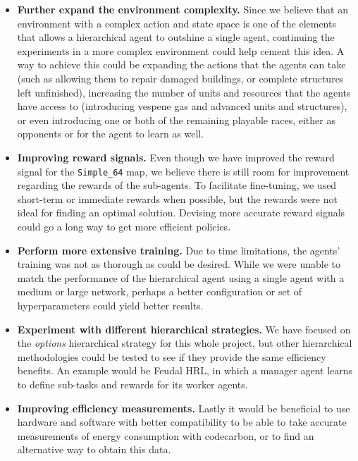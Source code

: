 \begin{itemize}
    \item \textbf{Further expand the environment complexity.} Since we believe that an environment with a complex action and state space is one of the elements that allows a hierarchical agent to outshine a single agent, continuing the experiments in a more complex environment could help cement this idea. A way to achieve this could be expanding the actions that the agents can take (such as allowing them to repair damaged buildings, or complete structures left unfinished), increasing the number of units and resources that the agents have access to (introducing vespene gas and advanced units and structures), or even introducing one or both of the remaining playable races, either as opponents or for the agent to learn as well.
    \item \textbf{Improving reward signals.} Even though we have improved the reward signal for the \texttt{Simple\_64} map, we believe there is still room for improvement regarding the rewards of the sub-agents. To facilitate fine-tuning, we used short-term or immediate rewards when possible, but the rewards were not ideal for finding an optimal solution. Devising more accurate reward signals could go a long way to get more efficient policies.
    \item \textbf{Perform more extensive training.} Due to time limitations, the agents' training was not as thorough as could be desired. While we were unable to match the performance of the hierarchical agent using a single agent with a medium or large network, perhaps a better configuration or set of hyperparameters could yield better results.
    \item \textbf{Experiment with different hierarchical strategies.} We have focused on the \textit{options} hierarchical strategy for this whole project, but other hierarchical methodologies could be tested to see if they provide the same efficiency benefits. An example would be Feudal HRL, in which a manager agent learns to define sub-tasks and rewards for its worker agents.
    \item \textbf{Improving efficiency measurements.} Lastly it would be beneficial to use hardware and software with better compatibility to be able to take accurate measurements of energy consumption with codecarbon, or to find an alternative way to obtain this data.
\end{itemize}